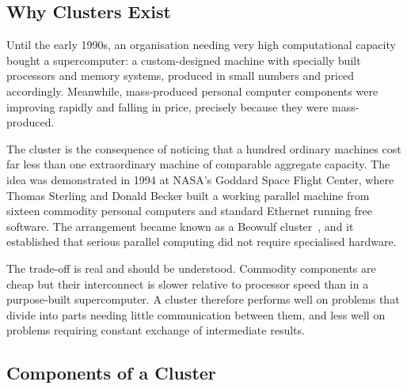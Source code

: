 \documentclass[../main.tex]{subfiles}
\begin{document}
\subsection{Why Clusters Exist}

Until the early 1990s, an organisation needing very high computational
capacity bought a supercomputer: a custom-designed machine with specially
built processors and memory systems, produced in small numbers and priced
accordingly. Meanwhile, mass-produced personal computer components were
improving rapidly and falling in price, precisely because they were
mass-produced.

The cluster is the consequence of noticing that a hundred ordinary machines
cost far less than one extraordinary machine of comparable aggregate
capacity. The idea was demonstrated in 1994 at NASA's Goddard Space Flight
Center, where Thomas Sterling and Donald Becker built a working parallel
machine from sixteen commodity personal computers and standard Ethernet
running free software. The arrangement became known as a Beowulf
cluster~, and it established that serious parallel computing did not require
specialised hardware.

The trade-off is real and should be understood. Commodity components are
cheap but their interconnect is slower relative to processor speed than in a
purpose-built supercomputer. A cluster therefore performs well on problems
that divide into parts needing little communication between them, and less
well on problems requiring constant exchange of intermediate results.

\subsection{Components of a Cluster}
\end{document}
